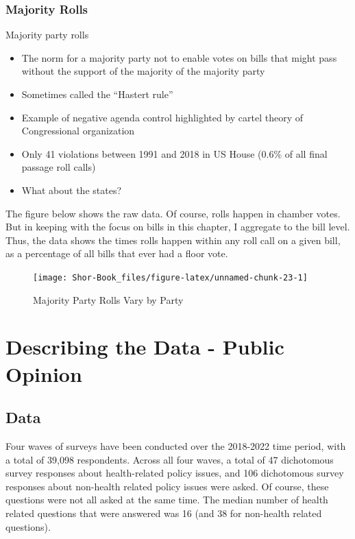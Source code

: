 \documentclass[
  oneside]{book}
\providecommand{\tightlist}{%
  \setlength{\itemsep}{0pt}\setlength{\parskip}{0pt}}
\begin{document}
\hypertarget{majority-rolls}{%
\subsection{Majority Rolls}\label{majority-rolls}}

Majority party rolls

\begin{itemize}
\tightlist
\item
  The norm for a majority party not to enable votes on bills that might pass without the support of the majority of the majority party
\item
  Sometimes called the ``Hastert rule''
\item
  Example of negative agenda control highlighted by cartel theory of Congressional organization
\item
  Only 41 violations between 1991 and 2018 in US House (0.6\% of all final passage roll calls)
\item
  What about the states? \citep{Anzia:2013}
\end{itemize}

The figure below shows the raw data. Of course, rolls happen in chamber votes. But in keeping with the focus on bills in this chapter, I aggregate to the bill level. Thus, the data shows the times rolls happen within any roll call on a given bill, as a percentage of all bills that ever had a floor vote.

\begin{figure}
\texttt{[image: Shor-Book\_files/figure-latex/unnamed-chunk-23-1]} \caption{Majority Party Rolls Vary by Party}\label{fig:unnamed-chunk-23}
\end{figure}

\hypertarget{describing-the-data---public-opinion}{%
\chapter{Describing the Data - Public Opinion}\label{describing-the-data---public-opinion}}

\hypertarget{data}{%
\section{Data}\label{data}}

Four waves of surveys have been conducted over the 2018-2022 time period, with a total of 39,098 respondents. Across all four waves, a total of 47 dichotomous survey responses about health-related policy issues, and 106 dichotomous survey responses about non-health related policy issues were asked. Of course, these questions were not all asked at the same time. The median number of health related questions that were answered was 16 (and 38 for non-health related questions).
\end{document}
